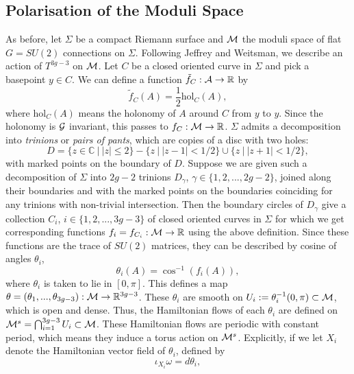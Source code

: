 \subsection{Polarisation of the Moduli Space}	
	As before, let $\Sigma$ be a compact Riemann surface and $\mathcal{M}$ the moduli space of flat $G=SU(2)$ connections on $\Sigma$. Following Jeffrey and Weitsman, we describe an action of $T^{3g-3}$ on $\mathcal{M}$. Let $C$ be a closed oriented curve in $\Sigma$ and pick a basepoint $y\in C$. We can define a function $\tilde{f}_C:\mathcal{A} \to \mathbb{R}$ by 
	\begin{equation}
		\tilde{f}_C(A) = \frac{1}{2}\text{hol}_C(A),
	\end{equation}
	where hol$_C(A)$ means the holonomy of $A$ around $C$ from $y$ to $y$. Since the holonomy is $\mathcal{G}$ invariant, this passes to $f_C:\mathcal{M} \to \mathbb{R}$. $\Sigma$ admits a decomposition into \textit{trinions} or \textit{pairs of pants}, which are copies of a disc with two holes:
	\begin{equation}
		D = \{z \in \mathbb{C}~|~ |z|\leq 2 \} - \{z~|~|z-1|<1/2\}\cup \{z~|~ |z+1| < 1/2\},
	\end{equation}
	with marked points on the boundary of $D$. Suppose we are given such a decomposition of $\Sigma$ into $2g-2$ trinions $D_\gamma$, $\gamma\in\{1,2,...,2g-2\}$, joined along their boundaries and with the marked points on the boundaries coinciding for any trinions with non-trivial intersection. Then the boundary circles of $D_\gamma$ give a collection $C_i$, $i\in\{1,2,...,3g-3\}$ of closed oriented curves in $\Sigma$ for which we get corresponding functions $f_i = f_{C_i}:\mathcal{M} \to \mathbb{R}$ using the above definition. Since these functions are the trace of $SU(2)$ matrices, they can be described by cosine of angles $\theta_i$,
	\begin{equation}
		\theta_i(A) = \cos^{-1}(f_i(A)),
	\end{equation}
	where $\theta_i$ is taken to lie in $[0,\pi]$. This defines a map $\theta = (\theta_1,...,\theta_{3g-3}):\mathcal{M} \to \mathbb{R}^{3g-3}$. These $\theta_i$ are smooth on $U_i := \theta_i^{-1}(0,\pi) \subset \mathcal{M}$, which is open and dense. Thus, the Hamiltonian flows of each $\theta_i$ are defined on $\mathcal{M}^{s} = \bigcap_{i=1}^{3g-3} U_i \subset \mathcal{M}$. These Hamiltonian flows are periodic with constant period, which means they induce a torus action on $\mathcal{M}^{s}$. Explicitly, if we let $X_i$ denote the Hamiltonian vector field of $\theta_i$, defined by
	\begin{equation}
		\iota_{X_i}\omega = d\theta_i,
	\end{equation}
